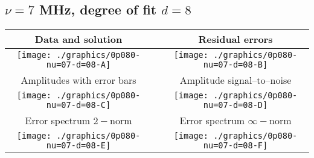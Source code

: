 

% 

\clearpage{}
\break{}

\subsection{$\nu = 7$ MHz, degree of fit $d = 8$}

\begin{table}[h]
    \begin{center}
        \begin{tabular}{ccc}
            Data and solution & \quad & Residual errors \\\hline
            \texttt{[image: ./graphics/0p080-nu=07-d=08-A]} &&
            \texttt{[image: ./graphics/0p080-nu=07-d=08-B]} \\[15pt]
            Amplitudes with error bars && Amplitude signal--to--noise \\\hline
            \texttt{[image: ./graphics/0p080-nu=07-d=08-C]} &&
            \texttt{[image: ./graphics/0p080-nu=07-d=08-D]} \\[15pt]
            Error spectrum $2-$norm && Error spectrum $\infty-$norm \\\hline
            \texttt{[image: ./graphics/0p080-nu=07-d=08-E]} &&
            \texttt{[image: ./graphics/0p080-nu=07-d=08-F]} \\[15pt]
        \end{tabular}
    \end{center}
\label{fig:elev=80, nu=7}
\end{table}



\endinput
